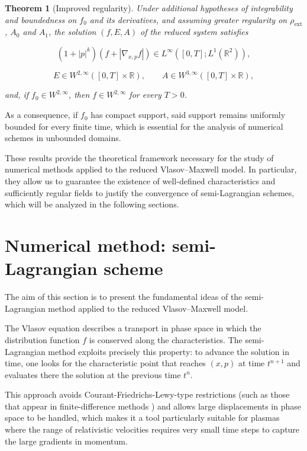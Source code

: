 \documentclass[11pt,a4paper,twoside,pdf]{article}
\numberwithin{equation}{section}
\newtheorem{theorem}{Theorem}[section]
\begin{document}
\begin{theorem}[Improved regularity]
Under additional hypotheses of integrability and boundedness on $f_0$ and its derivatives,
and assuming greater regularity on $\rho_{\mathrm{ext}}$, $A_0$ and $A_1$, the solution
$(f,E,A)$ of the reduced system satisfies


\[
(1+|p|^k)(f + |\nabla_{x,p} f|) \in L^\infty([0,T];L^1(\mathbb{R}^2)),
\]




\[
E\in W^{2,\infty}([0,T]\times\mathbb{R}), \qquad
A\in W^{3,\infty}([0,T]\times\mathbb{R}),
\]


and, if $f_0\in W^{2,\infty}$, then $f\in W^{2,\infty}$ for every $T>0$.
\end{theorem}

As a consequence, if $f_0$ has compact support, said support remains
uniformly bounded for every finite time, which is essential for the analysis
of numerical schemes in unbounded domains.

\medskip

These results provide the theoretical framework necessary for the study of numerical
methods applied to the reduced Vlasov--Maxwell model. In particular, they allow us
to guarantee the existence of well-defined characteristics and sufficiently
regular fields to justify the convergence of semi-Lagrangian schemes, which will
be analyzed in the following sections.





\section{Numerical method: semi-Lagrangian scheme}

The aim of this section is to present the fundamental ideas of the
semi-Lagrangian method applied to the reduced Vlasov--Maxwell model.



The Vlasov equation describes a transport in phase space in which the
distribution function $f$ is conserved along the characteristics. The
semi-Lagrangian method exploits precisely this property: to advance the solution in
time, one looks for the characteristic point that reaches $(x,p)$ at time $t^{n+1}$ and
evaluates there the solution at the previous time $t^n$.

This approach avoids Courant-Friedrichs-Lewy-type restrictions (such as those that appear in finite-difference methods \cite{dymer2025stable}) and allows large displacements in phase space to be handled,
which makes it a tool particularly
suitable for plasmas where the range of relativistic velocities requires very small time steps to capture the large gradients in momentum.
\end{document}
